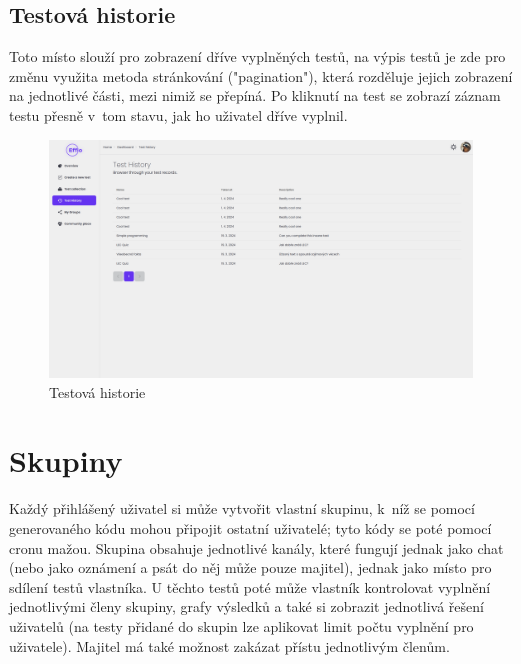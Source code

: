 \documentclass[12pt, a4paper,
openright
]{report}
\begin{document}
\subsection{Testová historie}
\label{subsec:historie}
Toto místo slouží pro zobrazení dříve vyplněných testů, na výpis testů je zde pro změnu využita metoda stránkování ("pagination"), která rozděluje jejich zobrazení na jednotlivé části, mezi nimiž se přepíná. Po kliknutí na test se zobrazí záznam testu přesně v~tom stavu, jak ho uživatel dříve vyplnil.

\begin{figure}[H]
	\centering %
	\includegraphics[width=1\linewidth]{image/history.png} 
	\caption{Testová historie} %
	\label{fig:history} %
\end{figure}

\section{Skupiny}
Každý přihlášený uživatel si může vytvořit vlastní skupinu, k~níž se pomocí generovaného kódu mohou připojit ostatní uživatelé; tyto kódy se poté pomocí cronu mažou. Skupina obsahuje jednotlivé kanály, které fungují jednak jako chat (nebo jako oznámení a psát do něj může pouze majitel), jednak jako místo pro sdílení testů vlastníka. U těchto testů poté může vlastník kontrolovat vyplnění jednotlivými členy skupiny, grafy výsledků a také si zobrazit jednotlivá řešení uživatelů (na testy přidané do skupin lze aplikovat limit počtu vyplnění pro uživatele). Majitel má také možnost zakázat přístu jednotlivým členům.
\end{document}
